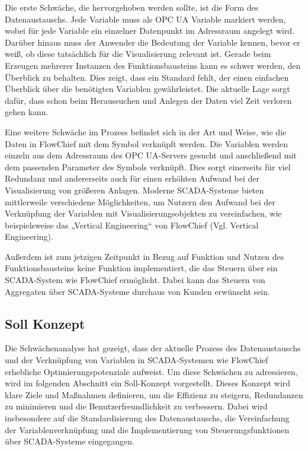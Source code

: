 Die erste Schwäche, die hervorgehoben werden sollte, ist die Form des Datenaustauschs. Jede Variable muss als OPC UA Variable markiert werden, wobei für jede Variable ein einzelner Datenpunkt im Adressraum angelegt wird. Darüber hinaus muss der Anwender die Bedeutung der Variable kennen, bevor er weiß, ob diese tatsächlich für die Visualisierung relevant ist. Gerade beim Erzeugen mehrerer Instanzen des Funktionsbausteins kann es schwer werden, den Überblick zu behalten. Dies zeigt, dass ein Standard fehlt, der einen einfachen Überblick über die benötigten Variablen gewährleistet. Die aktuelle Lage sorgt dafür, dass schon beim Heraussuchen und Anlegen der Daten viel Zeit verloren gehen kann.

Eine weitere Schwäche im Prozess befindet sich in der Art und Weise, wie die Daten in FlowChief mit dem Symbol verknüpft werden. Die Variablen werden einzeln aus dem Adressraum des OPC UA-Servers gesucht und anschließend mit dem passenden Parameter des Symbols verknüpft. Dies sorgt einerseits für viel Redundanz und andererseits auch für einen erhöhten Aufwand bei der Visualisierung von größeren Anlagen. Moderne SCADA-Systeme bieten mittlerweile verschiedene Möglichkeiten, um Nutzern den Aufwand bei der Verknüpfung der Variablen mit Visualisierungsobjekten zu vereinfachen, wie beispielsweise das „Vertical Engineering“ von FlowChief (Vgl. Vertical Engineering).

Außerdem ist zum jetzigen Zeitpunkt in Bezug auf Funktion und Nutzen des Funktionsbausteins keine Funktion implementiert, die das Steuern über ein SCADA-System wie FlowChief ermöglicht. Dabei kann das Steuern von Aggregaten über SCADA-Systeme durchaus von Kunden erwünscht sein.

\subsection{Soll Konzept}
Die Schwächenanalyse hat gezeigt, dass der aktuelle Prozess des Datenaustauschs und der Verknüpfung von Variablen in SCADA-Systemen wie FlowChief erhebliche Optimierungspotenziale aufweist. Um diese Schwächen zu adressieren, wird im folgenden Abschnitt ein Soll-Konzept vorgestellt. Dieses Konzept wird klare Ziele und Maßnahmen definieren, um die Effizienz zu steigern, Redundanzen zu minimieren und die Benutzerfreundlichkeit zu verbessern. Dabei wird insbesondere auf die Standardisierung des Datenaustauschs, die Vereinfachung der Variablenverknüpfung und die Implementierung von Steuerungsfunktionen über SCADA-Systeme eingegangen.

